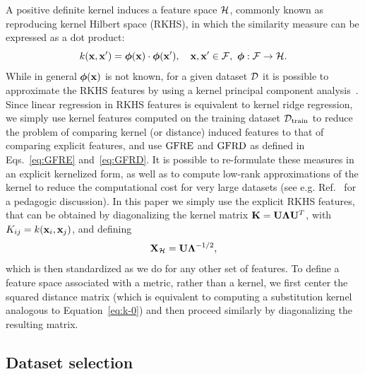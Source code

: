 A positive definite kernel induces a feature space $\mathcal{H}$, commonly known as reproducing kernel Hilbert space (RKHS), in which the similarity measure can be expressed as a dot product:
\begin{equation}
    k(\mathbf{x},\mathbf{x}^{\prime}) = \boldsymbol{\phi}(\mathbf{x})\cdot\boldsymbol{\phi}(\mathbf{x}^{\prime}),\quad \mathbf{x},\mathbf{x}^{\prime}\in\mathcal{F},\,\, \boldsymbol{\phi}:\mathcal{F}\rightarrow\mathcal{H}.
\end{equation}
While in general $\boldsymbol{\phi}(\mathbf{x})$ is not known, for a given dataset $\mathcal{D}$ it is possible to approximate the RKHS features by using a kernel principal component analysis~\cite{scholkopf1997kernel}. Since linear regression in RKHS features is equivalent to kernel ridge regression, we simply use kernel features computed on the training  dataset $\mathcal{D}_{\mathrm{train}}$ to reduce the problem of comparing kernel (or distance) induced features to that of comparing explicit features, and use $\operatorname{GFRE}$ and $\operatorname{GFRD}$ as defined in Eqs.~\eqref{eq:GFRE} and~\eqref{eq:GFRD}. 
It is possible to re-formulate these measures in an explicit kernelized form, as well as to compute low-rank approximations of the kernel to reduce the computational cost for very large datasets (see e.g. Ref.~ for a pedagogic discussion). In this paper we simply use the explicit RKHS features, that can be obtained by diagonalizing the kernel matrix $\mathbf{K} = \mathbf{U} \boldsymbol{\Lambda} \mathbf{U}^T$, with $K_{ij} = k(\mathbf{x}_i, \mathbf{x}_j)$, and defining
\begin{equation}
\mathbf{X}_{\mathcal{H}} = \mathbf{U} \boldsymbol{\Lambda}^{-1/2},
\end{equation}
which is then standardized as we do for any other set of features. 
To define a feature space associated with a metric, rather than a kernel, we first center the squared distance matrix (which is equivalent to computing a substitution kernel analogous to Equation~\eqref{eq:k-0}) and then proceed similarly by diagonalizing the resulting matrix. 



\subsection{Dataset selection}

